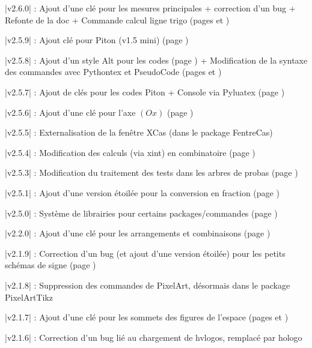 {{{{{\small \bverb|v2.6.0| : Ajout d'une clé  pour les mesures principales + correction d'un bug + Refonte de la doc + Commande calcul ligne trigo (pages \pageref{mesureprincipale} et \pageref{lignestrigo})}

{\small \bverb|v2.5.9| : Ajout clé  pour \textsf{Piton} (v1.5 mini) (page \pageref{pythonpiton})}

{\small \bverb|v2.5.8| : Ajout d'un style \textsf{Alt} pour les codes (page \pageref{pythonsimple}) + Modification de la syntaxe des commandes avec \textsf{Pythontex} et \textsf{PseudoCode} (pages \pageref{pythontex} et \pageref{pseudocode})}

{\small \bverb|v2.5.7| : Ajout de clés pour les codes \textsf{Piton} + Console via \textsf{Pyluatex} (page \pageref{pythonpiton})}

{\small \bverb|v2.5.6| : Ajout d'une clé  pour l'axe $(Ox)$ (page \pageref{reperagetikz})}

{\small \bverb|v2.5.5| : Externalisation de la fenêtre XCas (dans le package \textsf{FentreCas})}

{\small \bverb|v2.5.4| : Modification des calculs (via \textsf{xint}) en combinatoire (page \pageref{combinatoire})}

{\small \bverb|v2.5.3| : Modification du traitement des tests dans les arbres de probas (page \pageref{arbresprobas})}

{\small \bverb|v2.5.1| : Ajout d'une version étoilée pour la conversion en fraction (page \pageref{convfrac})}

{\small \bverb|v2.5.0| : Système de \textsf{librairies} pour certains packages/commandes (page \pageref{librairies})}

{\small \bverb|v2.2.0| : Ajout d'une clé  pour les arrangements et combinaisons (page \pageref{combinatoire})}

{\small \bverb|v2.1.9| : Correction d'un bug (et ajout d'une version étoilée) pour les petits schémas \og de signe \fg{} (page \pageref{aidesigne})}

{\small \bverb|v2.1.8| : Suppression des commandes de PixelArt, désormais dans le package \textsf{PixelArtTikz}}

{\small \bverb|v2.1.7| : Ajout d'une clé  pour les sommets des figures de l'espace (pages \pageref{pave} et \pageref{tetra})}

{\small \bverb|v2.1.6| : Correction d'un bug lié au chargement de \textsf{hvlogos}, remplacé par \textsf{hologo}}

}}}}
